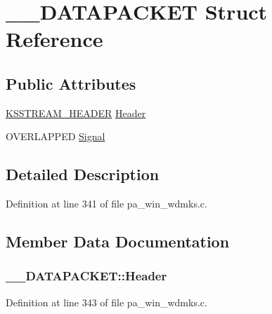 \hypertarget{struct_____d_a_t_a_p_a_c_k_e_t}{}\section{\+\_\+\+\_\+\+D\+A\+T\+A\+P\+A\+C\+K\+ET Struct Reference}
\label{struct_____d_a_t_a_p_a_c_k_e_t}
\subsection*{Public Attributes}
\begin{DoxyCompactItemize}
\item 
\hyperlink{struct_k_s_s_t_r_e_a_m___h_e_a_d_e_r}{K\+S\+S\+T\+R\+E\+A\+M\+\_\+\+H\+E\+A\+D\+ER} \hyperlink{struct_____d_a_t_a_p_a_c_k_e_t_a6e3a48774a511f5bbc64bef3ae780d2c}{Header}
\item 
O\+V\+E\+R\+L\+A\+P\+P\+ED \hyperlink{struct_____d_a_t_a_p_a_c_k_e_t_aa4ee2aff55460a89851b305543017691}{Signal}
\end{DoxyCompactItemize}


\subsection{Detailed Description}


Definition at line 341 of file pa\+\_\+win\+\_\+wdmks.\+c.



\subsection{Member Data Documentation}
\subsubsection[{\texorpdfstring{Header}{Header}}]{ \+\_\+\+\_\+\+D\+A\+T\+A\+P\+A\+C\+K\+E\+T\+::\+Header}\hypertarget{struct_____d_a_t_a_p_a_c_k_e_t_a6e3a48774a511f5bbc64bef3ae780d2c}{}\label{struct_____d_a_t_a_p_a_c_k_e_t_a6e3a48774a511f5bbc64bef3ae780d2c}


Definition at line 343 of file pa\+\_\+win\+\_\+wdmks.\+c.

